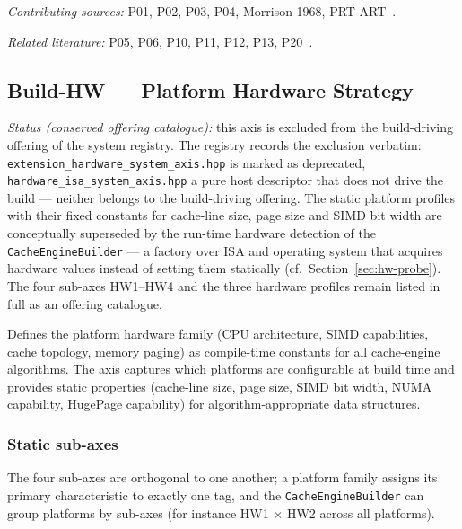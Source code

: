 \emph{Contributing sources:} P01, P02, P03, P04, Morrison 1968, PRT-ART~\cite{leis2013art,binna2018hot,mao2012masstree,boffa2024coco,morrison1968patricia}.

\emph{Related literature:} P05, P06, P10, P11, P12, P13, P20~\cite{fent2020start,schmeisser2022b2tree,zhang2018surf,rao1999css,rao2000csb,hankins2003nodesize,mueller2025btreesback}.

\subsection{Build-HW — Platform Hardware Strategy}

\emph{Status (conserved offering catalogue):} this axis is excluded from the build-driving offering of the system registry. The registry records the exclusion verbatim: \texttt{extension\_\allowbreak{}hardware\_\allowbreak{}system\_\allowbreak{}axis.hpp} is marked as deprecated, \texttt{hardware\_\allowbreak{}isa\_\allowbreak{}system\_\allowbreak{}axis.hpp} a pure host descriptor that does not drive the build --- neither belongs to the build-driving offering. The static platform profiles with their fixed constants for cache-line size, page size and SIMD bit width are conceptually superseded by the run-time hardware detection of the \texttt{Cache\allowbreak{}Engine\allowbreak{}Builder} --- a factory over ISA and operating system that acquires hardware values instead of setting them statically (cf.\ Section~\ref{sec:hw-probe}). The four sub-axes HW1--HW4 and the three hardware profiles remain listed in full as an offering catalogue.

Defines the platform hardware family (CPU architecture, SIMD capabilities, cache topology, memory paging) as compile-time constants for all cache-engine algorithms. The axis captures which platforms are configurable at build time and provides static properties (cache-line size, page size, SIMD bit width, NUMA capability, Huge\allowbreak{}Page capability) for algorithm-appropriate data structures.

\subsubsection*{Static sub-axes}

The four sub-axes are orthogonal to one another; a platform family assigns its primary characteristic to exactly one tag, and the \texttt{Cache\allowbreak{}Engine\allowbreak{}Builder} can group platforms by sub-axes (for instance HW1 $\times$ HW2 across all platforms).

